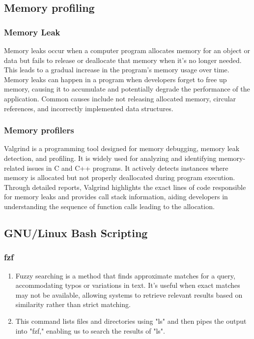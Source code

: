 \documentclass[titlepage]{article}
\begin{document}
\subsection{Memory profiling}
\subsubsection{Memory Leak}
Memory leaks occur when a computer program allocates memory for an object or data but fails to release or deallocate that memory when it's no longer needed. This leads to a gradual increase in the program's memory usage over time. Memory leaks can happen in a program when developers forget to free up memory, causing it to accumulate and potentially degrade the performance of the application. Common causes include not releasing allocated memory, circular references, and incorrectly implemented data structures.
\subsubsection{Memory profilers}
Valgrind is a programming tool designed for memory debugging, memory leak detection, and profiling. It is widely used for analyzing and identifying memory-related issues in C and C++ programs. It actively detects instances where memory is allocated but not properly deallocated during program execution. Through detailed reports, Valgrind highlights the exact lines of code responsible for memory leaks and provides call stack information, aiding developers in understanding the sequence of function calls leading to the allocation.
\newpage
\subsection{GNU/Linux Bash Scripting}
\subsubsection{fzf}
\begin{enumerate}
    \item Fuzzy searching is a method that finds approximate matches for a query, accommodating typos or variations in text. It's useful when exact matches may not be available, allowing systems to retrieve relevant results based on similarity rather than strict matching.

    \item This command lists files and directories using "ls" and then pipes the output into "fzf," enabling us to search the results of "ls".
\end{enumerate}
\end{document}
